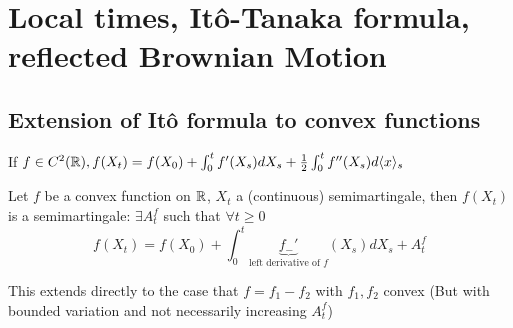 \chapter{Local times, Itô-Tanaka formula, reflected Brownian Motion}

\section{Extension of Itô formula to convex functions}

If $f\in C^2(\mathbb{R}), f(X_t)=f(X_0)+\int_0^t f'(X_s)dX_s+\frac{1}{2}\int_0^t f''(X_s)d\langle x\rangle_s$

\begin{proposition}\label{prop:3.1}
    Let $f$ be a convex function on $\mathbb{R}$, $X_t$ a (continuous) semimartingale, 
    then $f(X_t)$ is a semimartingale: $\exists A_t^f$ such that $\forall t\geq 0$
    \[f(X_t)=f(X_0)+\int_{0}^t \underbrace{f_-'}_{\text{left derivative of }f}(X_s)dX_s+A_t^f\]
\end{proposition}

\begin{remark}
    This extends directly to the case that $f=f_1-f_2$ with $f_1,f_2$ convex (But with bounded variation and not necessarily increasing $A_t^f$)
\end{remark}

